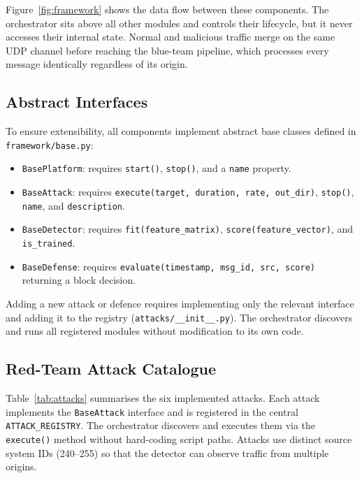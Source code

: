 Figure~\ref{fig:framework} shows the data flow between these components.
The orchestrator sits above all other modules and controls their lifecycle, but it never accesses their internal state.
Normal and malicious traffic merge on the same UDP channel before reaching the blue-team pipeline, which processes every message identically regardless of its origin.



\subsection{Abstract Interfaces}

To ensure extensibility, all components implement abstract base classes defined in \texttt{framework/base.py}:

\begin{itemize}
    \item \texttt{BasePlatform}: requires \texttt{start()}, \texttt{stop()}, and a \texttt{name} property.
    \item \texttt{BaseAttack}: requires \texttt{execute(target, duration, rate, out\_dir)}, \texttt{stop()}, \texttt{name}, and \texttt{description}.
    \item \texttt{BaseDetector}: requires \texttt{fit(feature\_matrix)}, \texttt{score(feature\_vector)}, and \texttt{is\_trained}.
    \item \texttt{BaseDefense}: requires \texttt{evaluate(timestamp, msg\_id, src, score)} returning a block decision.
\end{itemize}

Adding a new attack or defence requires implementing only the relevant interface and adding it to the registry (\texttt{attacks/\_\_init\_\_.py}). The orchestrator discovers and runs all registered modules without modification to its own code.

\subsection{Red-Team Attack Catalogue}

Table~\ref{tab:attacks} summarises the six implemented attacks.
Each attack implements the \texttt{BaseAttack} interface and is registered in the central \texttt{ATTACK\_REGISTRY}. The orchestrator discovers and executes them via the \texttt{execute()} method without hard-coding script paths.
Attacks use distinct source system IDs (240--255) so that the detector can observe traffic from multiple origins.

